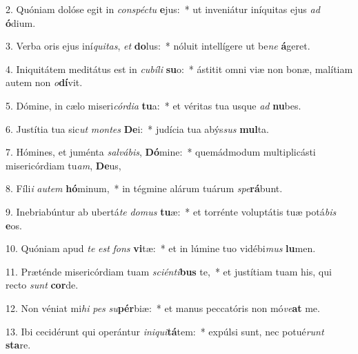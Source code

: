 2. Quóniam dolóse egit in \textit{con}\textit{spéc}\textit{tu} \textbf{e}jus:~*  ut inveniátur iníquitas ejus \textit{ad} \textbf{ó}dium.\

3. Verba oris ejus iní\textit{qui}\textit{tas}, \textit{et} \textbf{do}lus:~*  nóluit intellígere ut be\textit{ne} \textbf{á}geret.\

4. Iniquitátem meditátus est in \textit{cu}\textit{bí}\textit{li} \textbf{su}o:~*  ástitit omni viæ non bonæ, malítiam autem non \textit{o}\textbf{dí}vit.\

5. Dómine, in cælo miseri\textit{cór}\textit{di}\textit{a} \textbf{tu}a:~*  et véritas tua usque \textit{ad} \textbf{nu}bes.\

6. Justítia tua sic\textit{ut} \textit{mon}\textit{tes} \textbf{De}i:~*  judícia tua abýs\textit{sus} \textbf{mul}ta.\

7. Hómines, et juménta \textit{sal}\textit{vá}\textit{bis}, \textbf{Dó}mine:~*  quemádmodum multiplicásti misericórdiam tu\textit{am}, \textbf{De}us,\

8. Fíli\textit{i} \textit{au}\textit{tem} \textbf{hó}minum,~*  in tégmine alárum tuárum \textit{spe}\textbf{rá}bunt.\

9. Inebriabúntur ab ubertá\textit{te} \textit{do}\textit{mus} \textbf{tu}æ:~*  et torrénte voluptátis tuæ potá\textit{bis} \textbf{e}os.\

10. Quóniam apud \textit{te} \textit{est} \textit{fons} \textbf{vi}tæ:~*  et in lúmine tuo vidébi\textit{mus} \textbf{lu}men.\

11. Præténde misericórdiam tuam \textit{sci}\textit{én}\textit{ti}\textbf{bus} te,~*  et justítiam tuam his, qui recto \textit{sunt} \textbf{cor}de.\

12. Non véniat mi\textit{hi} \textit{pes} \textit{su}\textbf{pér}biæ:~*  et manus peccatóris non mó\textit{ve}\textbf{at} me.\

13. Ibi cecidérunt qui operántur \textit{in}\textit{i}\textit{qui}\textbf{tá}tem:~*  expúlsi sunt, nec potué\textit{runt} \textbf{sta}re.\

